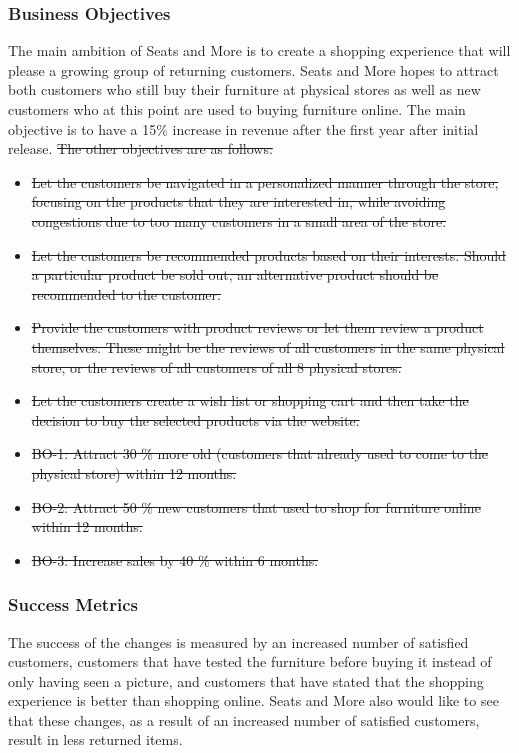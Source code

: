 \documentclass[a4paper]{article}
\begin{document}
\subsubsection*{Business Objectives}
The main ambition of Seats and More is to create a shopping experience that will please a growing group of returning customers. Seats and More hopes to attract both customers who still buy their furniture at physical stores as well as new customers who at this point are used to buying furniture online. The main objective is to have a 15\% increase in revenue after the first year after initial release. \sout{The other objectives are as follows:}
\begin{itemize}
\item \sout{Let the customers be navigated in a personalized manner through the store, focusing on the products that they are interested in, while avoiding congestions due to too many customers in a small area of the store.}
\item \sout{Let the customers be recommended products based on their interests. Should a particular product be sold out, an alternative product should be recommended to the customer.}
\item \sout{Provide the customers with product reviews or let them review a product themselves. These might be the reviews of all customers in the same physical store, or the reviews of all customers of all 8 physical stores.}
\item \sout{Let the customers create a wish list or shopping cart and then take the decision to buy the selected products via the website.}
\item \sout{BO-1: Attract 30 \% more old (customers that already used to come to the physical store) within 12 months.}
\item \sout{BO-2: Attract 50 \% new customers that used to shop for furniture online within 12 months.}
\item \sout{BO-3: Increase sales by 40 \% within 6 months.}
\end{itemize}

\subsubsection*{Success Metrics}
The success of the changes is measured by an increased number of satisfied customers, customers that have tested the furniture before buying it instead of only having seen a picture, \color{blue}and customers that have stated that the shopping experience is better than shopping online. \color{black}Seats and More also would like to see that these changes, as a result of an increased number of satisfied customers, result in less returned items.
\end{document}

